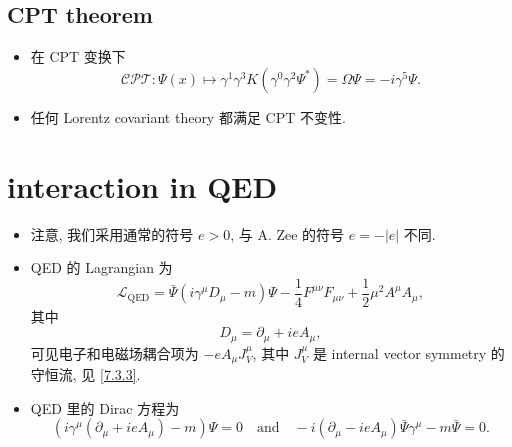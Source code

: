 \subsection{CPT theorem}
\begin{itemize}
	\item 在 CPT 变换下
	\begin{equation}
		\mathcal{CPT} : \Psi(x) \mapsto \gamma^1 \gamma^3 K (\gamma^0 \gamma^2 \Psi^*) = \Omega \Psi = - i \gamma^5 \Psi.
	\end{equation}
	
	\item 任何 Lorentz covariant theory 都满足 CPT 不变性.
\end{itemize}

\section{interaction in QED}
\begin{itemize}
	\item 注意, 我们采用通常的符号 $e > 0$, 与 A. Zee 的符号 $e = - |e|$ 不同.
	
	\item QED 的 Lagrangian 为
	\begin{equation} \label{7.6.1}
		\mathcal{L}_\text{QED} = \bar{\Psi} (i \gamma^\mu D_\mu - m) \Psi - \frac{1}{4} F^{\mu \nu} F_{\mu \nu} + \frac{1}{2} \mu^2 A^\mu A_\mu,
	\end{equation}
	其中
	\begin{equation}
		D_\mu = \partial_\mu + i e A_\mu,
	\end{equation}
	可见电子和电磁场耦合项为 $- e A_\mu J_V^\mu$, 其中 $J_V^\mu$ 是 internal vector symmetry 的守恒流, 见 \eqref{7.3.3}.
	
	\item QED 里的 Dirac 方程为
	\begin{equation}
		(i \gamma^\mu (\partial_\mu + i e A_\mu) - m) \Psi = 0 \quad \text{and} \quad - i (\partial_\mu - i e A_\mu) \bar{\Psi} \gamma^\mu - m \bar{\Psi} = 0.
	\end{equation}
\end{itemize}


